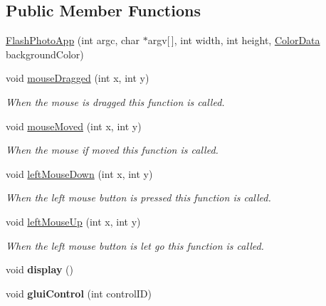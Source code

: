\subsection*{Public Member Functions}
\begin{DoxyCompactItemize}
\item 
\hyperlink{classFlashPhotoApp_a944931218613603cfb6bda6113971382}{Flash\+Photo\+App} (int argc, char $\ast$argv\mbox{[}$\,$\mbox{]}, int width, int height, \hyperlink{classColorData}{Color\+Data} background\+Color)
\item 
void \hyperlink{classFlashPhotoApp_a29505b498fac898e099cfd1b8590c91a}{mouse\+Dragged} (int x, int y)\hypertarget{classFlashPhotoApp_a29505b498fac898e099cfd1b8590c91a}{}\label{classFlashPhotoApp_a29505b498fac898e099cfd1b8590c91a}

\begin{DoxyCompactList}\small\item\em When the mouse is dragged this function is called. \end{DoxyCompactList}\item 
void \hyperlink{classFlashPhotoApp_acf5a4cc5b76bb676d337758543bfdcc4}{mouse\+Moved} (int x, int y)\hypertarget{classFlashPhotoApp_acf5a4cc5b76bb676d337758543bfdcc4}{}\label{classFlashPhotoApp_acf5a4cc5b76bb676d337758543bfdcc4}

\begin{DoxyCompactList}\small\item\em When the mouse if moved this function is called. \end{DoxyCompactList}\item 
void \hyperlink{classFlashPhotoApp_a2c348ddcc15b6a21972bc6aac98c5442}{left\+Mouse\+Down} (int x, int y)\hypertarget{classFlashPhotoApp_a2c348ddcc15b6a21972bc6aac98c5442}{}\label{classFlashPhotoApp_a2c348ddcc15b6a21972bc6aac98c5442}

\begin{DoxyCompactList}\small\item\em When the left mouse button is pressed this function is called. \end{DoxyCompactList}\item 
void \hyperlink{classFlashPhotoApp_ae3a2f37b7c3657dcb5c16402c6d25519}{left\+Mouse\+Up} (int x, int y)\hypertarget{classFlashPhotoApp_ae3a2f37b7c3657dcb5c16402c6d25519}{}\label{classFlashPhotoApp_ae3a2f37b7c3657dcb5c16402c6d25519}

\begin{DoxyCompactList}\small\item\em When the left mouse button is let go this function is called. \end{DoxyCompactList}\item 
void {\bfseries display} ()\hypertarget{classFlashPhotoApp_a5dedc84bbc9ea0cf0718b8d0d0f414a5}{}\label{classFlashPhotoApp_a5dedc84bbc9ea0cf0718b8d0d0f414a5}

\item 
void {\bfseries glui\+Control} (int control\+ID)\hypertarget{classFlashPhotoApp_aaeea3b8490d0f0239e41b781f6a066aa}{}\label{classFlashPhotoApp_aaeea3b8490d0f0239e41b781f6a066aa}

\end{DoxyCompactItemize}
